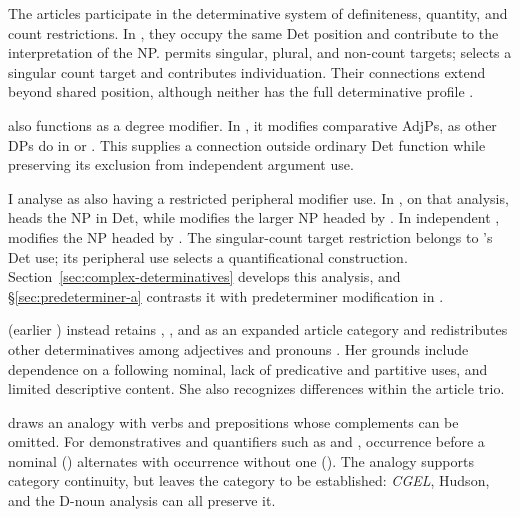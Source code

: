 \documentclass[12pt]{article}
\begin{document}
The articles participate in the determinative system of definiteness, quantity, and count restrictions. In , they occupy the same Det position and contribute to the interpretation of the NP.  permits singular, plural, and non-count targets;  selects a singular count target and contributes individuation. Their connections extend beyond shared position, although neither has the full determinative profile \citep[368--373]{huddleston2002}.

 also functions as a degree modifier. In , it modifies comparative AdjPs, as other DPs do in  or  \citep[1131--1132, 1135--1136]{huddleston2002}. This supplies a connection outside ordinary Det function while preserving its exclusion from independent argument use.

I analyse  as also having a restricted peripheral modifier use. In , on that analysis,  heads the NP in Det, while  modifies the larger NP headed by . In independent ,  modifies the NP headed by . The singular-count target restriction belongs to 's Det use; its peripheral use selects a quantificational construction. Section~\ref{sec:complex-determinatives} develops this analysis, and §\ref{sec:predeterminer-a} contrasts it with predeterminer modification in .

\textcite[153--158]{spinillo2004reconceptualising} (earlier \citealp{spinillo2000determiners}) instead retains , , and  as an expanded article category and redistributes other determinatives among adjectives and pronouns \citep[194--195]{spinillo2004reconceptualising}. Her grounds include dependence on a following nominal, lack of predicative and partitive uses, and limited descriptive content. She also recognizes differences within the article trio.

\textcite[140--144]{spinillo2004reconceptualising} draws an analogy with verbs and prepositions whose complements can be omitted. For demonstratives and quantifiers such as  and , occurrence before a nominal () alternates with occurrence without one (). The analogy supports category continuity, but leaves the category to be established: \textit{CGEL}, Hudson, and the D-noun analysis can all preserve it.
\end{document}
